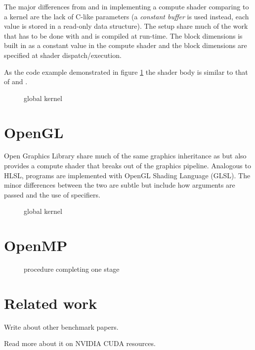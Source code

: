 The major differences from {\CU} and {\OCL} in implementing a compute shader comparing to a kernel are the lack of C-like parameters (a \emph{constant buffer} is used instead, each value is stored in a read-only data structure). The setup share much of the work that has to be done with {\OCL} and is compiled at run-time. The block dimensions is built in as a constant value in the compute shader and the block dimensions are specified at shader dispatch/execution.

As the code example demonstrated in figure \ref{lst:sample:global:dx} the shader body is similar to that of {\CU} and {\OCL}.

\begin{figure}
	\centering
	\fbox{}
	\caption{{\DX} global kernel}
	\label{lst:sample:global:dx}	
\end{figure}

\section{OpenGL}

Open Graphics Library {\GL} share much of the same graphics inheritance as {\DX} but also provides a compute shader that breaks out of the graphics pipeline. Analogous to HLSL, {\GL} programs are implemented with OpenGL Shading Language (GLSL). The minor differences between the two are subtle but include how arguments are passed and the use of specifiers.

\begin{figure}
	\centering
	\fbox{}
	\caption{{\GL} global kernel}
	\label{lst:sample:global:gl}	
\end{figure}

\section{OpenMP}%
%
\begin{figure}%
	\centering%
	\fbox{}%
	\caption{{\OMP} procedure completing one stage}%
	\label{lst:sample:global:omp}%
\end{figure}%

\section{Related work}

Write about other benchmark papers.

Read more about it on NVIDIA CUDA resources.